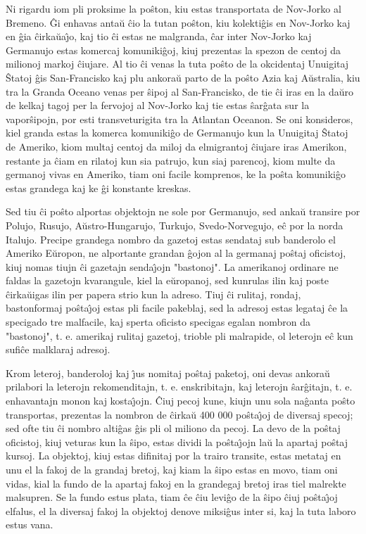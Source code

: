    Ni rigardu iom pli proksime la po\^ston, kiu estas transportata
de Nov-Jorko al Bremeno. \^Gi enhavas anta\u u \^cio la tutan
po\^ston, kiu kolekti\^gis en Nov-Jorko kaj en \^gia \^cirka\u
ua\^{\j}o, kaj tio \^ci estas ne malgranda, \^car inter Nov-Jorko
kaj Germanujo estas komercaj komuniki\^goj, kiuj prezentas la spezon
de centoj da milionoj markoj \^ciujare. Al tio \^ci venas la tuta
po\^sto de la okcidentaj Unuigitaj \^Statoj \^gis San-Francisko kaj
plu ankora\u u parto de la po\^sto Azia kaj A\u ustralia, kiu tra la
Granda Oceano venas per \^sipoj al San-Francisko, de tie \^ci iras
en la da\u uro de kelkaj tagoj per la fervojoj al Nov-Jorko kaj tie
estas \^sar\^gata sur la vapor\^sipojn, por esti transveturigita tra
la Atlantan Oceanon. Se oni konsideros, kiel granda estas la komerca
komuniki\^go de Germanujo kun la Unuigitaj \^Statoj de Ameriko, kiom
multaj centoj da miloj da elmigrantoj \^ciujare iras Amerikon,
restante ja \^ciam en rilatoj kun sia patrujo, kun siaj parencoj,
kiom multe da germanoj vivas en Ameriko, tiam oni facile komprenos,
ke la po\^sta komuniki\^go estas grandega kaj ke \^gi konstante
kreskas.

   Sed tiu \^ci po\^sto alportas objektojn ne sole por Germanujo, sed
anka\u u transire por Polujo, Rusujo, A\u ustro-Hungarujo, Turkujo,
Svedo-Norvegujo, e\^c por la norda Italujo. Precipe grandega nombro
da gazetoj estas sendataj sub banderolo el Ameriko E\u uropon, ne
alportante grandan \^gojon al la germanaj po\^staj oficistoj, kiuj
nomas tiujn \^ci gazetajn senda\^{\j}ojn "bastonoj". La amerikanoj
ordinare ne faldas la gazetojn kvarangule, kiel la e\u uropanoj, sed
kunrulas ilin kaj poste \^cirka\u uigas ilin per papera strio kun la
adreso. Tiuj \^ci rulitaj, rondaj, bastonformaj po\^sta\^{\j}oj
estas pli facile pakeblaj, sed la adresoj estas legataj \^ce la
specigado tre malfacile, kaj sperta oficisto specigas egalan nombron
da "bastonoj", t. e. amerikaj rulitaj gazetoj, trioble pli
malrapide, ol leterojn e\^c kun sufi\^ce malklaraj adresoj.

   Krom leteroj, banderoloj kaj \^{\j}us nomitaj po\^staj paketoj, oni devas
an\-ko\-ra\u u prilabori la leterojn rekomenditajn, t. e.
enskribitajn, kaj leterojn \^sar\^gitajn, t. e. enhavantajn monon
kaj kosta\^{\j}ojn. \^Ciuj pecoj kune, kiujn unu sola na\^ganta
po\^sto transportas, prezentas la nombron de \^cirka\u u 400 000
po\^sta\^{\j}oj de diversaj specoj; sed ofte tiu \^ci nombro
alti\^gas \^gis pli ol miliono da pecoj. La devo de la po\^staj
oficistoj, kiuj veturas kun la \^sipo, estas dividi la
po\^sta\^{\j}ojn la\u u la apartaj po\^staj kursoj. La objektoj,
kiuj estas difinitaj por la trairo transite, estas metataj en unu el
la fakoj de la grandaj bretoj, kaj kiam la \^sipo estas en movo,
tiam oni vidas, kial la fundo de la apartaj fakoj en la grandegaj
bretoj iras tiel malrekte malsupren. Se la fundo estus plata, tiam
\^ce \^ciu levi\^go de la \^sipo \^ciuj po\^sta\^{\j}oj elfalus, el
la diversaj fakoj la objektoj denove miksi\^gus inter si, kaj la
tuta laboro estus vana.

